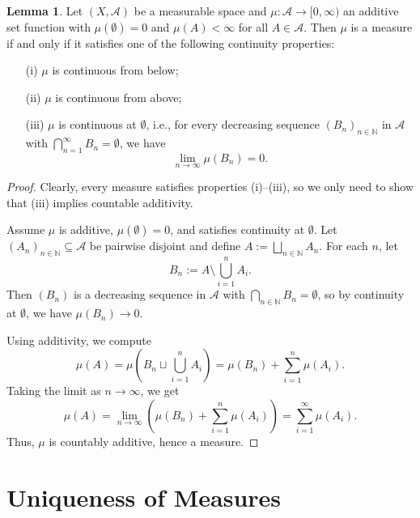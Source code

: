 \documentclass[12pt]{article}
\theoremstyle{definition}
\newtheorem{lemma}[theorem]{Lemma}
\begin{document}
\medskip
\begin{lemma}
Let \((X, \mathcal{A})\) be a measurable space and \(\mu : \mathcal{A} \to [0, \infty)\) an additive set function with \(\mu(\emptyset) = 0\) and \(\mu(A) < \infty\) for all \(A \in \mathcal{A}\). Then \(\mu\) is a measure if and only if it satisfies one of the following continuity properties:

\begin{enumerate}
  \item[(i)] \(\mu\) is continuous from below;
  \item[(ii)] \(\mu\) is continuous from above;
  \item[(iii)] \(\mu\) is continuous at \(\emptyset\), i.e., for every decreasing sequence \((B_n)_{n \in \mathbb{N}}\) in \(\mathcal{A}\) with \(\bigcap_{n=1}^\infty B_n = \emptyset\), we have
  \[
    \lim_{n \to \infty} \mu(B_n) = 0.
  \]
\end{enumerate}
\end{lemma}

\begin{proof}
Clearly, every measure satisfies properties (i)–(iii), so we only need to show that (iii) implies countable additivity.

Assume \(\mu\) is additive, \(\mu(\emptyset) = 0\), and satisfies continuity at \(\emptyset\). Let \((A_n)_{n \in \mathbb{N}} \subseteq \mathcal{A}\) be pairwise disjoint and define \(A := \bigsqcup_{n \in \mathbb{N}} A_n\). For each \(n\), let
\[
B_n := A \setminus \bigcup_{i=1}^n A_i.
\]
Then \((B_n)\) is a decreasing sequence in \(\mathcal{A}\) with \(\bigcap_{n \in \mathbb{N}} B_n = \emptyset\), so by continuity at \(\emptyset\), we have \(\mu(B_n) \to 0\).

Using additivity, we compute
\[
\mu(A) = \mu\left(B_n \sqcup \bigcup_{i=1}^n A_i\right) = \mu(B_n) + \sum_{i=1}^n \mu(A_i).
\]
Taking the limit as \(n \to \infty\), we get
\[
\mu(A) = \lim_{n \to \infty} \left( \mu(B_n) + \sum_{i=1}^n \mu(A_i) \right) = \sum_{i=1}^\infty \mu(A_i).
\]
Thus, \(\mu\) is countably additive, hence a measure.
\end{proof}



\vspace{3em}
\section{Uniqueness of Measures}
\end{document}
